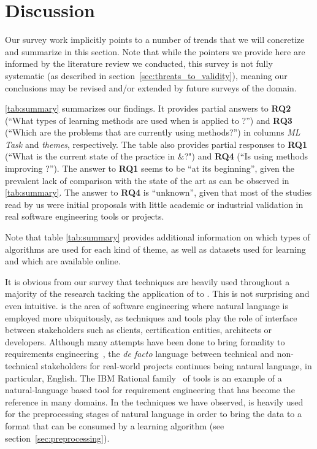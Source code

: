 \section{Discussion}
\label{sec:discussion}

Our survey work implicitly points to a number of trends that we will
concretize and summarize in this section. Note that while the pointers we
provide here are informed by the literature review we conducted, this survey is
not fully systematic (as described in section~\ref{sec:threats_to_validity}),
meaning our conclusions may be revised and/or extended by future surveys of the
domain.

\Tab \ref{tab:summary} summarizes our findings. It provides partial answers to
\textbf{RQ2} (``What types of learning methods are used when \ML is applied to
\RE?'') and \textbf{RQ3} (``Which are the \RE problems that are currently using
\ML methods?'') in columns \emph{ML Task} and  \emph{themes}, respectively.
The table also provides partial responses to \textbf{RQ1} (``What is the current
state of the practice in \ML${\&}$\RE?") and \textbf{RQ4} (``Is using \ML
methods improving \RE?''). The answer to \textbf{RQ1} seems to be ``at its
beginning'', given the prevalent lack of comparison with the state of the art
as can be observed in \tab \ref{tab:summary}. The answer to \textbf{RQ4} is
``unknown'', given that most of the studies read by us were initial proposals
with little academic or industrial validation in real software engineering tools or projects.

Note that table \ref{tab:summary} provides additional information on which types of
algorithms are used for each kind of theme, as well as datasets used for
learning and which are available online.

It is obvious from our survey that \NLP techniques are heavily used
throughout a majority of the research tacking the application of \ML to
\RE. This is not surprising and even intuitive. \RE is the area of software
engineering where natural language is employed more ubiquitously, as \RE
techniques and tools play the role of interface between stakeholders such as
clients, certification entities, architects or developers. Although many
attempts have been done to bring formality to requirements
engineering~\cite{Teufl17,LucioRCA16}, the \emph{de facto} language between
technical and non-technical stakeholders for real-world projects continues being
natural language, in particular, English.
The IBM Rational \DOORS family~\cite{doors} of tools is an example
of a natural-language based tool for requirement engineering that has become the
reference in many domains. In the techniques we have observed, \NLP is heavily
used for the preprocessing stages of natural language in order to bring the data to a format
that can be consumed by a learning algorithm (see
section~\ref{sec:preprocessing}).
 
